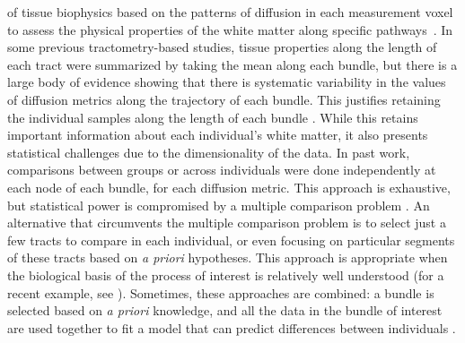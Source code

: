 \documentclass[10pt,%
               aps,%
               prl,%
               preprint,%
               superscriptaddress,%
               preprintnumbers,%
               amsmath,%
               floatfix,%
               endfloats*]{revtex4-1}
\begin{document}
of tissue biophysics based on the patterns of diffusion in each measurement
voxel to assess the physical properties of the white matter along specific
pathways~\cite{Bells2011-cf}.
In some previous tractometry-based studies, tissue properties along the
length of each tract were summarized by taking the mean along each
bundle, but there is a large body of evidence showing that there is
systematic variability in the values of diffusion metrics along the
trajectory of each bundle. This justifies retaining the individual
samples along the length of each bundle \cite{yeatman2012tract,
colby2012, ODonnell2009-uu}. While this retains important information
about each individual's white matter, it also presents statistical
challenges due to the dimensionality of the data. In past work,
comparisons between groups or across individuals were done
independently at each node of each bundle, for each
diffusion metric. This approach is exhaustive, but
statistical power is compromised by a multiple comparison problem
\cite{colby2012, Nichols2002-zu, Nichols2003-yy}. An alternative that
circumvents the multiple comparison problem is to select just a few
tracts to compare in each individual, or even focusing on particular
segments of these tracts based on \emph{a priori} hypotheses. This
approach is appropriate when the biological basis of the process
of interest is relatively well understood (for a recent example, see
\cite{huber2018rapid}). Sometimes, these approaches are combined: a
bundle is selected based on \emph{a priori} knowledge, and all the data
in the bundle of interest are used together to fit a model that can
predict differences between individuals \cite{dayan2016profilometry}.
\end{document}
